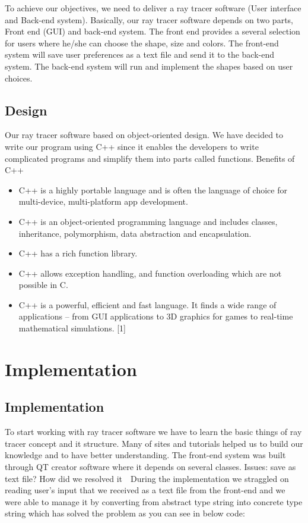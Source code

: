 \documentclass{article}
\begin{document}
To achieve our objectives, we need to deliver a ray tracer software (User interface and Back-end system). 
Basically, our ray tracer software depends on two parts, Front end (GUI) and back-end system. The front end provides a several selection for users where he/she can choose the shape, size and colors. The front-end system will save user preferences as a text file and send it to the back-end system. 
The back-end system will run and implement the shapes based on user choices.



\subsection{Design}

Our ray tracer software based on object-oriented design. We have decided to write our program using C++ since it enables the developers to write complicated programs and simplify them into parts called functions. 
Benefits of C++
\begin{itemize}
    \item 
	C++ is a highly portable language and is often the language of choice for multi-device, multi-platform app development.
\item	C++ is an object-oriented programming language and includes classes, inheritance, polymorphism, data abstraction and encapsulation.
\item	C++ has a rich function library.
\item	C++ allows exception handling, and function overloading which are not possible in C.
\item	C++ is a powerful, efficient and fast language. It finds a wide range of applications – from GUI applications to 3D graphics for games to real-time mathematical simulations. [1]

\end{itemize}

\section{Implementation}
\subsection{Implementation}
To start working with ray tracer software we have to learn the basic things of ray tracer concept and it structure. Many of sites and tutorials helped us to build our knowledge and to have better understanding. The front-end system was built through QT creator software where it depends on several classes. Issues: save as text file? How did we resolved it   
During the implementation we straggled on reading user’s input that we received as a text file from the front-end and we were able to manage it by converting from abstract type string into concrete type string which has solved the problem as you can see in below code: 
\end{document}
